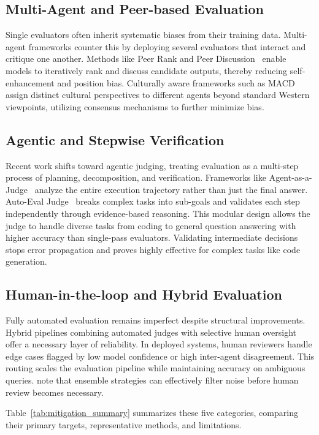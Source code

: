 \subsection{Multi-Agent and Peer-based Evaluation}
Single evaluators often inherit systematic biases from their training data. Multi-agent frameworks counter this by deploying several evaluators that interact and critique one another. Methods like Peer Rank and Peer Discussion~\cite{prd} enable models to iteratively rank and discuss candidate outputs, thereby reducing self-enhancement and position bias. Culturally aware frameworks such as MACD~\cite{macd} assign distinct cultural perspectives to different agents beyond standard Western viewpoints, utilizing consensus mechanisms to further minimize bias.

\subsection{Agentic and Stepwise Verification}
Recent work shifts toward agentic judging, treating evaluation as a multi-step process of planning, decomposition, and verification. Frameworks like Agent-as-a-Judge~\cite{agent_judge} analyze the entire execution trajectory rather than just the final answer. Auto-Eval Judge~\cite{auto_eval_judge} breaks complex tasks into sub-goals and validates each step independently through evidence-based reasoning. This modular design allows the judge to handle diverse tasks from coding to general question answering with higher accuracy than single-pass evaluators. Validating intermediate decisions stops error propagation and proves highly effective for complex tasks like code generation.

\subsection{Human-in-the-loop and Hybrid Evaluation}
Fully automated evaluation remains imperfect despite structural improvements. Hybrid pipelines combining automated judges with selective human oversight offer a necessary layer of reliability. In deployed systems, human reviewers handle edge cases flagged by low model confidence or high inter-agent disagreement. This routing scales the evaluation pipeline while maintaining accuracy on ambiguous queries. \citet{comm_systems} note that ensemble strategies can effectively filter noise before human review becomes necessary.

Table~\ref{tab:mitigation_summary} summarizes these five categories, comparing their primary targets, representative methods, and limitations.

